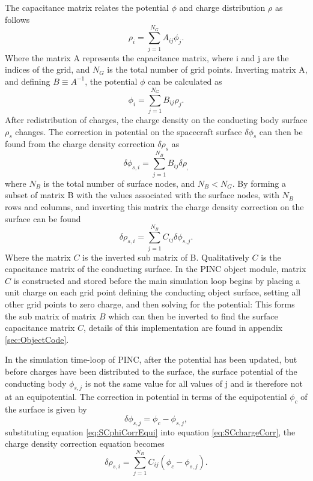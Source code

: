 The capacitance matrix relates the potential $\phi$ and charge distribution $\rho$ as follows \parencite{Miyake2009}
\begin{equation}
    \rho_i = \sum^{N_G}_{j=1} A_{ij} \phi_j.
\end{equation}
Where the matrix A represents the capacitance matrix, where i and j are the indices of the grid, and $N_G$ is the total number of grid points. Inverting matrix A, and defining $B \equiv A^{-1}$, the potential $\phi$ can be calculated as 
\begin{equation}
    \phi_i = \sum^{N_G}_{j=1} B_{ij} \rho_j.
\end{equation}
After redistribution of charges, the charge density on the conducting body surface $\rho_s$ changes. The correction in potential on the spacecraft surface $\delta \phi_s$ can then be found from the charge density correction $\delta \rho_s$ as
\begin{equation}
    \delta \phi_{s,i} = \sum^{N_B}_{j=1} B_{ij} \delta \rho_,
\end{equation}
where $N_B$ is the total number of surface nodes, and $N_B < N_G$. By forming a subset of matrix B with the values associated with the surface nodes, with $N_B$ rows and columns, and inverting this matrix the charge density correction on the surface can be found
\begin{equation}\label{eq:SCchargeCorr}
    \delta \rho_{s,i} = \sum^{N_B}_{j=1} C_{ij} \delta \phi_{s,j}.
\end{equation}
Where the matrix $C$ is the inverted sub matrix of B. Qualitatively $C$ is the capacitance matrix of the conducting surface. In the PINC object module, matrix $C$ is constructed and stored before the main simulation loop begins by placing a unit charge on each grid point defining the conducting object surface, setting all other grid points to zero charge, and then solving for the potential: This forms the sub matrix of matrix $B$ which can then be inverted to find the surface capacitance matrix $C$, details of this implementation are found in appendix \ref{sec:ObjectCode}.

In the simulation time-loop of PINC, after the potential has been updated, but before charges have been distributed to the surface, the surface potential of the conducting body $\phi_{s,j}$ is not the same value for all values of j and is therefore not at an equipotential. The correction in potential in terms of the equipotential $\phi_c$ of the surface is given by
\begin{equation}\label{eq:SCphiCorrEqui}
    \delta \phi_{s,j} = \phi_c - \phi_{s,j},
\end{equation}
substituting equation \eqref{eq:SCphiCorrEqui} into equation \eqref{eq:SCchargeCorr}, the charge density correction equation becomes
\begin{equation}\label{eq:SCrhoCorrNew}
    \delta \rho_{s,i} = \sum^{N_B}_{j=1} C_{ij} (\phi_c - \phi_{s,j}).
\end{equation}

